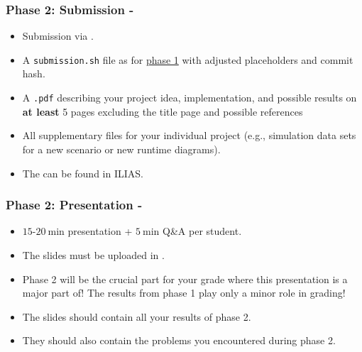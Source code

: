 \begin{frame}[fragile]
  \frametitle{Phase 2: Submission - \dateDeadlinePhaseTwo}
  \begin{itemize}
      \item Submission via .
      \item A \texttt{submission.sh} file as for \hyperref[phase1_requirements]{phase 1} with adjusted placeholders and commit hash.
      \item A \texttt{.pdf} describing your project idea, implementation, and possible results on \textbf{at least} 5 pages excluding the title page and possible references
      \item All supplementary files for your individual project (e.g., simulation data sets for a new scenario or new runtime diagrams).
      \item The \link{\urlIliasLatexTemplate}{\LaTeX\xspace template} can be found in ILIAS.
  \end{itemize}
\end{frame}

\begin{frame}[fragile]
  \frametitle{Phase 2: Presentation - \dateFinal}
  \begin{itemize}
    \item $15$-$\SI{20}{\minute}$ presentation + $\SI{5}{\minute}$ Q\&A per student.
    \item The slides must be uploaded in .
    \item Phase 2 will be the crucial part for your grade where this presentation is a major part of! The results from phase 1 play only a minor role in grading!
    \vspace*{1em}
    \item The slides should contain all your results of phase 2.
    \item They should also contain the problems you encountered during phase 2.
  \end{itemize}
\end{frame}

